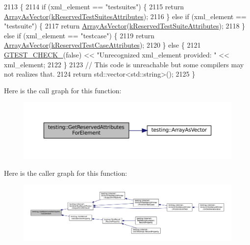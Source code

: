 \begin{DoxyCode}
2113                                   \{
2114   \textcolor{keywordflow}{if} (xml\_element == \textcolor{stringliteral}{"testsuites"}) \{
2115     \textcolor{keywordflow}{return} \hyperlink{namespacetesting_a956d4c522454fa6dfd75b5bbbefe8f9e}{ArrayAsVector}(\hyperlink{namespacetesting_afa194c15a2ac0e03029019b0f4029968}{kReservedTestSuitesAttributes});
2116   \} \textcolor{keywordflow}{else} \textcolor{keywordflow}{if} (xml\_element == \textcolor{stringliteral}{"testsuite"}) \{
2117     \textcolor{keywordflow}{return} \hyperlink{namespacetesting_a956d4c522454fa6dfd75b5bbbefe8f9e}{ArrayAsVector}(\hyperlink{namespacetesting_af44b2969928d37e9081145760f21e79a}{kReservedTestSuiteAttributes});
2118   \} \textcolor{keywordflow}{else} \textcolor{keywordflow}{if} (xml\_element == \textcolor{stringliteral}{"testcase"}) \{
2119     \textcolor{keywordflow}{return} \hyperlink{namespacetesting_a956d4c522454fa6dfd75b5bbbefe8f9e}{ArrayAsVector}(\hyperlink{namespacetesting_ae9689f28cd859736f734623b26c93d88}{kReservedTestCaseAttributes});
2120   \} \textcolor{keywordflow}{else} \{
2121     \hyperlink{gtest-port_8h_ab54343f0a36dc4cb0ce8a478dd7847b8}{GTEST\_CHECK\_}(\textcolor{keyword}{false}) << \textcolor{stringliteral}{"Unrecognized xml\_element provided: "} << xml\_element;
2122   \}
2123   \textcolor{comment}{// This code is unreachable but some compilers may not realizes that.}
2124   \textcolor{keywordflow}{return} std::vector<std::string>();
2125 \}
\end{DoxyCode}
Here is the call graph for this function\+:
\nopagebreak
\begin{figure}[H]
\begin{center}
\leavevmode
\includegraphics[width=350pt]{namespacetesting_acb3fdfadf475a3c2f5e22a3dae73532a_cgraph}
\end{center}
\end{figure}
Here is the caller graph for this function\+:
\nopagebreak
\begin{figure}[H]
\begin{center}
\leavevmode
\includegraphics[width=350pt]{namespacetesting_acb3fdfadf475a3c2f5e22a3dae73532a_icgraph}
\end{center}
\end{figure}
